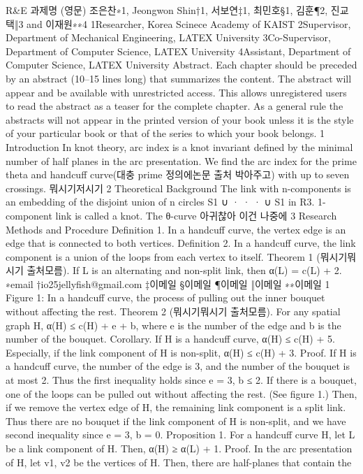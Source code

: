 R&E 과제명 (영문)
조은찬∗1, Jeongwon Shin†1, 서보연‡1, 최민호§1, 김훈¶2, 진교택‖3 and 이재원∗∗4
1Researcher, Korea Scinece Academy of KAIST
2Supervisor, Department of Mechanical Engineering, LATEX University
3Co-Supervisor, Department of Computer Science, LATEX University
4Assistant, Department of Computer Science, LATEX University
Abstract. Each chapter should be preceded by an abstract (10–15 lines long) that summarizes the
content. The abstract will appear and be available with unrestricted access. This allows unregistered
users to read the abstract as a teaser for the complete chapter. As a general rule the abstracts will not
appear in the printed version of your book unless it is the style of your particular book or that of the
series to which your book belongs.
1 Introduction
In knot theory, arc index is a knot invariant defined by the minimal number of half planes in the arc presentation.
We find the arc index for the prime theta and handcuff curve(대충 prime 정의에논문 출처 박아주고) with up to
seven crossings. 뭐시기저시기
2 Theoretical Background
The link with n-components is an embedding of the disjoint union of n circles S1 ∪ · · · ∪ S1 in R3. 1-component link
is called a knot. The θ-curve 아귀찮아 이건 나중에
3 Research Methods and Procedure
Definition 1. In a handcuff curve, the vertex edge is an edge that is connected to both vertices.
Definition 2. In a handcuff curve, the link component is a union of the loops from each vertex to itself.
Theorem 1 (뭐시기뭐시기 출처모름). If L is an alternating and non-split link, then
α(L) = c(L) + 2.
∗email
†io25jellyfish@gmail.com
‡이메일
§이메일
¶이메일
‖이메일
∗∗이메일
1
Figure 1: In a handcuff curve, the process of pulling out the inner bouquet without affecting the rest.
Theorem 2 (뭐시기뭐시기 출처모름). For any spatial graph H,
α(H) ≤ c(H) + e + b,
where e is the number of the edge and b is the number of the bouquet.
Corollary. If H is a handcuff curve,
α(H) ≤ c(H) + 5.
Especially, if the link component of H is non-split,
α(H) ≤ c(H) + 3.
Proof. If H is a handcuff curve, the number of the edge is 3, and the number of the bouquet is at most 2. Thus the
first inequality holds since e = 3, b ≤ 2. If there is a bouquet, one of the loops can be pulled out without affecting
the rest. (See figure 1.) Then, if we remove the vertex edge of H, the remaining link component is a split link. Thus
there are no bouquet if the link component of H is non-split, and we have second inequality since e = 3, b = 0.
Proposition 1. For a handcuff curve H, let L be a link component of H. Then,
α(H) ≥ α(L) + 1.
Proof. In the arc presentation of H, let v1, v2 be the vertices of H. Then, there are half-planes that contain the
